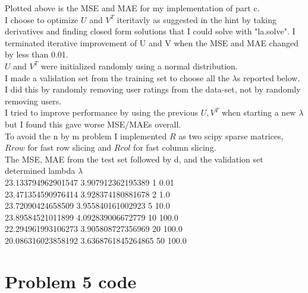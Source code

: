 \documentclass{article}
\newcommand{\1}{\mathbf{1}}
\begin{document}
 Plotted above is the MSE and MAE for my implementation of part c. \\

I choose to optimize $U$ and $V^T$ iteritavly as suggested in the hint by taking derivatives and finding closed form solutions that I could solve with "la.solve". I terminated iterative improvement of U and V when the MSE and MAE changed by less than 0.01. \\

$U$ and $V^T$ were initialized randomly using a normal distribution. \\

I made a validation set from the training set to choose all the $\lambda$s reported below. I did this by randomly removing user ratings from the data-set, not by randomly removing users.\\ 

I tried to improve performance by using the previous $U, V^T$ when starting a new $\lambda$ but I found this gave worse MSE/MAEs overall. \\

To avoid the n by m problem I implemented $R$ as two scipy sparse matrices, $Rrow$ for fast row slicing and $Rcol$ for fast column slicing. \\

The MSE, MAE from the test set followed by d, and the validation set determined lambda $\lambda$ \\
23.133794962901547 3.907912362195389 1 0.01 \\
23.471354590976414 3.928374180881678 2 1.0 \\
23.72090424658509 3.955840161002923 5 10.0 \\
23.89584521011899 4.092839006672779 10 100.0 \\
22.294961993106273 3.905808727356969 20 100.0 \\
20.086316023858192 3.6368761845264865 50 100.0 \\



\section*{Problem 5 code}


\end{document}
